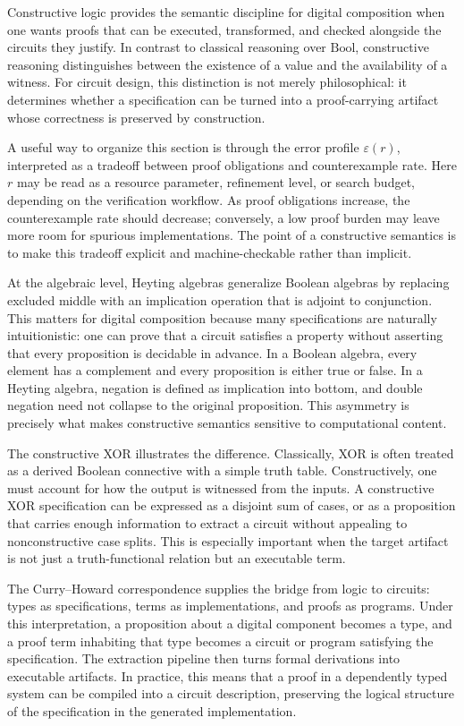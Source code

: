 Constructive logic provides the semantic discipline for digital composition when one wants proofs that can be executed, transformed, and checked alongside the circuits they justify. In contrast to classical reasoning over \(\mathrm{Bool}\), constructive reasoning distinguishes between the existence of a value and the availability of a witness. For circuit design, this distinction is not merely philosophical: it determines whether a specification can be turned into a proof-carrying artifact whose correctness is preserved by construction.

A useful way to organize this section is through the error profile \(\varepsilon(r)\), interpreted as a tradeoff between proof obligations and counterexample rate. Here \(r\) may be read as a resource parameter, refinement level, or search budget, depending on the verification workflow. As proof obligations increase, the counterexample rate should decrease; conversely, a low proof burden may leave more room for spurious implementations. The point of a constructive semantics is to make this tradeoff explicit and machine-checkable rather than implicit.

At the algebraic level, Heyting algebras generalize Boolean algebras by replacing excluded middle with an implication operation that is adjoint to conjunction. This matters for digital composition because many specifications are naturally intuitionistic: one can prove that a circuit satisfies a property without asserting that every proposition is decidable in advance. In a Boolean algebra, every element has a complement and every proposition is either true or false. In a Heyting algebra, negation is defined as implication into bottom, and double negation need not collapse to the original proposition. This asymmetry is precisely what makes constructive semantics sensitive to computational content.

The constructive XOR illustrates the difference. Classically, XOR is often treated as a derived Boolean connective with a simple truth table. Constructively, one must account for how the output is witnessed from the inputs. A constructive XOR specification can be expressed as a disjoint sum of cases, or as a proposition that carries enough information to extract a circuit without appealing to nonconstructive case splits. This is especially important when the target artifact is not just a truth-functional relation but an executable term.

The Curry--Howard correspondence supplies the bridge from logic to circuits: types as specifications, terms as implementations, and proofs as programs. Under this interpretation, a proposition about a digital component becomes a type, and a proof term inhabiting that type becomes a circuit or program satisfying the specification. The extraction pipeline then turns formal derivations into executable artifacts. In practice, this means that a proof in a dependently typed system can be compiled into a circuit description, preserving the logical structure of the specification in the generated implementation.

